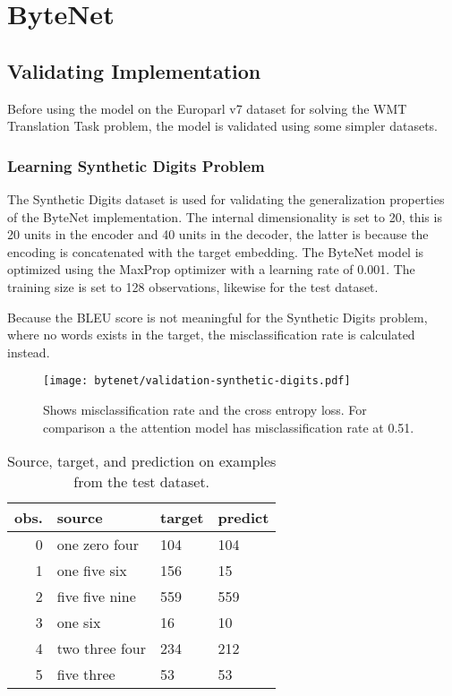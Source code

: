 
\section{ByteNet}

\subsection{Validating Implementation}

Before using the model on the Europarl v7 dataset for solving the WMT Translation Task problem, the model is validated using some simpler datasets.

\subsubsection{Learning Synthetic Digits Problem}

The Synthetic Digits dataset is used for validating the generalization properties of the ByteNet implementation. The internal dimensionality is set to 20, this is 20 units in the encoder and 40 units in the decoder, the latter is because the encoding is concatenated with the target embedding. The ByteNet model is optimized using the MaxProp optimizer with a learning rate of 0.001. The training size is set to 128 observations, likewise for the test dataset.

Because the BLEU score is not meaningful for the Synthetic Digits problem, where no words exists in the target, the misclassification rate is calculated instead.

\begin{figure}[H]
    \centering
    \texttt{[image: bytenet/validation-synthetic-digits.pdf]}
    \caption{Shows misclassification rate and the cross entropy loss. For comparison a the attention model has misclassification rate at 0.51.}
    \label{fig:result:bytenet:digits}
\end{figure}

\begin{table}[H]
\centering
\begin{tabular}{r|p{3.3cm} p{3.3cm} p{3.3cm}}
	obs. & source & target & predict\\ \hline
  0 & one zero four & 104 & 104 \\
  1 & one five six & 156 & 15 \\
  2 & five five nine & 559 & 559 \\
  3 & one six & 16 & 10 \\
  4 & two three four & 234 & 212 \\
  5 & five three & 53 & 53
\end{tabular}
\caption{Source, target, and prediction on examples from the test dataset.}
\label{table:result:bytenet:digits}
\end{table}

